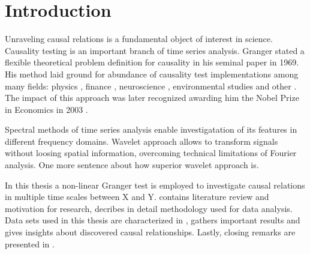 \section{Introduction}

Unraveling causal relations is a fundamental object of interest in science.
Causality testing is an important branch of time series analysis.
Granger \cite{granger69} stated a flexible theoretical problem definition for causality in his seminal paper in 1969.
His method laid ground for abundance of causality test implementations among many fields:
physics \cite{inverse-ising,coupled-oscillators},
finance \cite{hiemstra-jones, gold-stock},
neuroscience \cite{Bullmore2009,causality-eeg,causality-visual},
environmental studies \cite{dogan2016co,ecological-economics}
and other \cite{social-media}.
The impact of this approach was later recognized awarding him the Nobel Prize in Economics in 2003 \cite{nobel2003}.

Spectral methods of time series analysis enable investigatation of its features in different frequency domains.
Wavelet approach allows to transform signals without loosing spatial information, overcoming technical limitations of Fourier analysis.
One more sentence about how superior wavelet approach is.

In this thesis a non-linear Granger test is employed to investigate causal relations in multiple time scales between X and Y.
 contains literature review and motivation for research,
 decribes in detail methodology used for data analysis.
Data sets used in this thesis are characterized in ,
 gathers important results and gives insights about discovered causal relationships.
Lastly, closing remarks are presented in .
